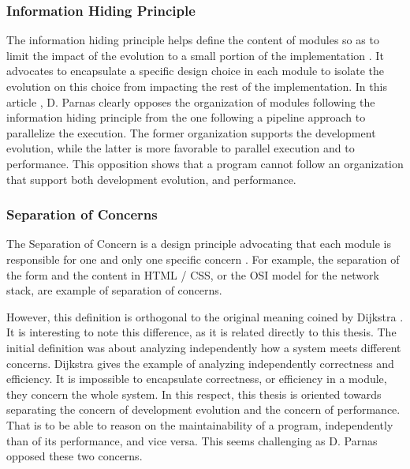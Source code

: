 \subsubsection{Information Hiding Principle}

The information hiding principle helps define the content of modules so as to limit the impact of the evolution to a small portion of the implementation \cite{Parnas1972}.
It advocates to encapsulate a specific design choice in each module to isolate the evolution on this choice from impacting the rest of the implementation.
In this article \cite{Parnas1972}, D. Parnas clearly opposes the organization of modules following the information hiding principle from the one following a pipeline approach to parallelize the execution.
The former organization supports the development evolution, while the latter is more favorable to parallel execution and to performance.
This opposition shows that a program cannot follow an organization that support both development evolution, and performance.


\subsubsection{Separation of Concerns}

The Separation of Concern is a design principle advocating that each module is responsible for one and only one specific concern \cite{Tarr1999,Hursch1995}.
For example, the separation of the form and the content in HTML / CSS, or the OSI model for the network stack, are example of separation of concerns.

However, this definition is orthogonal to the original meaning coined by Dijkstra \cite{Dijkstra1982}.
It is interesting to note this difference, as it is related directly to this thesis.
The initial definition was about analyzing independently how a system meets different concerns.
Dijkstra gives the example of analyzing independently correctness and efficiency.
It is impossible to encapsulate correctness, or efficiency in a module, they concern the whole system.
In this respect, this thesis is oriented towards separating the concern of development evolution and the concern of performance.
That is to be able to reason on the maintainability of a program, independently than of its performance, and vice versa.
This seems challenging as D. Parnas opposed these two concerns.

